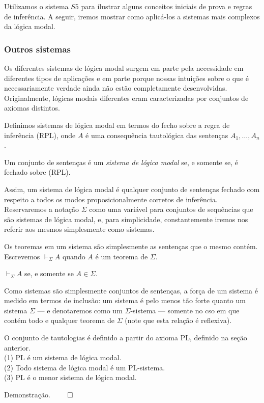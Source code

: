 Utilizamos o sistema $S5$ para ilustrar alguns conceitos iniciais de prova e
regras de inferência. A seguir, iremos mostrar como aplicá-los a sistemas mais
complexos da lógica modal.

\subsubsection{Outros sistemas}
\label{ssub:Outrossistemas}

Os diferentes sistemas de lógica modal surgem em parte pela necessidade em diferentes
tipos de aplicações e em parte porque nossas intuições sobre o que é necessariamente
verdade ainda não estão completamente desenvolvidas. Originalmente, lógicas
modais diferentes eram caracterizadas por conjuntos de axiomas distintos. 

Definimos sistemas de lógica modal em termos do fecho sobre a regra de
inferência (RPL), onde $A$ é uma consequência tautológica das sentenças $A_1,
\ldots, A_n$.

\begin{definition}
   Um conjunto de sentenças é um \textit{sistema de lógica modal} se, e somente
   se, é fechado sobre (RPL).
\end{definition}

Assim, um sistema de lógica modal é qualquer conjunto de sentenças fechado com
respeito a todos os modos proposicionalmente corretos de inferência.
Reservaremos a notação $\Sigma$ como uma variável para conjuntos de sequências
que são sistemas de lógica modal, e, para simplicidade, constantemente iremos
nos referir aos mesmos simplesmente como sistemas.

Os teoremas em um sistema são simplesmente as sentenças que o mesmo contém.
Escrevemos $\vdash_{\Sigma} A$ quando $A$ é um teorema de $\Sigma$.

\begin{definition}
    $\vdash_{\Sigma} A$ se, e somente se $A \in \Sigma$.
\end{definition}

Como sistemas são simplesmente conjuntos de sentenças, a força de um sistema é medido em
termos de inclusão: um sistema é pelo menos tão forte quanto um sistema $\Sigma$
--- e denotaremos como um $\Sigma$-sistema --- somente no cso em que contém todo
e qualquer teorema de $\Sigma$ (note que esta relação é reflexiva).

\begin{theorem}
    O conjunto de tautologias é definido a partir do axioma PL, definido na
    seção anterior.\\
    (1) PL é um sistema de lógica modal. \\
    (2) Todo sistema de lógica modal é um PL-sistema. \\
    (3) PL é o menor sistema de lógica modal.
\end{theorem}
Demonstração. $\qed$

